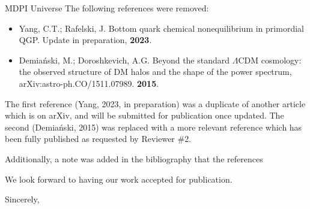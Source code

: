 \documentclass[a4paper, 10pt]{letter}
\begin{document}
\begin{letter}{MDPI Universe}
The following references were removed:
\begin{itemize}
    \item Yang, C.T.; Rafelski, J. {Bottom quark chemical nonequilibrium in primordial QGP}. Update in preparation, {\bf 2023}.
    \item Demia\'nski, M.; Doroshkevich, A.G. {Beyond the standard $\Lambda$CDM cosmology: the observed structure of DM halos and the shape of the power spectrum}, arXiv:astro-ph.CO/1511.07989. {\bf 2015}.
\end{itemize}
The first reference (Yang, 2023, in preparation) was a duplicate of another article which is on arXiv, and will be submitted for publication once updated. The second (Demia\'nski, 2015) was replaced with a more relevant reference which has been fully published as requested by Reviewer \#2.

Additionally, a note was added in the bibliography that the references


We look forward to having our work accepted for publication.

\closing{Sincerely,}

\end{letter}
\end{document}
